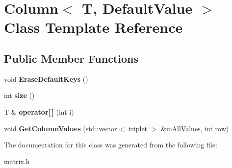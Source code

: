 \hypertarget{classColumn}{}\section{Column$<$ T, Default\+Value $>$ Class Template Reference}
\label{classColumn}
\subsection*{Public Member Functions}
\begin{DoxyCompactItemize}
\item 
\mbox{\label{classColumn_a956035aa2ed4785eacb34a8a7c24d245}} 
void {\bfseries Erase\+Default\+Keys} ()
\item 
\mbox{\label{classColumn_a88766db76c7efdc2dfcb078d788e974c}} 
int {\bfseries size} ()
\item 
\mbox{\label{classColumn_a430730ecc811df01578c4c394da1a4d3}} 
T \& {\bfseries operator\mbox{[}$\,$\mbox{]}} (int i)
\item 
\mbox{\label{classColumn_ac890a06f78379575c2663eb20f0a9b8d}} 
void {\bfseries Get\+Column\+Values} (std\+::vector$<$ triplet $>$ \&m\+All\+Values, int row)
\end{DoxyCompactItemize}


The documentation for this class was generated from the following file\+:\begin{DoxyCompactItemize}
\item 
matrix.\+h\end{DoxyCompactItemize}
